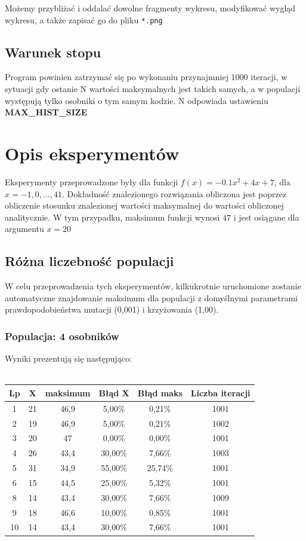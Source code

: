 \documentclass[a4paper,11pt]{article}
\begin{document}
			Możemy przybliżać i oddalać dowolne fragmenty wykresu, modyfikować wygląd wykresu, a także zapisać go do pliku \texttt{*.png}
			
		\subsection{Warunek stopu}
		Program powinien zatrzymać się po wykonaniu przynajmniej 1000 iteracji, w sytuacji gdy ostanie N wartości maksymalnych jest takich samych, a w populacji występują tylko osobniki o tym samym kodzie. N odpowiada ustawieniu \textbf{MAX\_HIST\_SIZE}
		
	\section{Opis eksperymentów}
	Eksperymenty przeprowadzone były dla funkcji $f(x) = -0.1x^2 + 4x + 7$, dla $x = -1, 0, ..., 41$. Dokładność znalezionego rozwiązania obliczona jest poprzez obliczenie stosunku znalezionej wartości maksymalnej do wartości obliczonej analitycznie. W tym przypadku, maksimum funkcji wynosi $47$ i jest osiągane dla argumentu $x = 20$
	
		\subsection{Różna liczebność populacji}
			W celu przeprowadzenia tych eksperymentów, kilkukrotnie uruchomione zostanie  automatyczne znajdowanie maksimum dla populacji z domyślnymi parametrami prawdopodobieństwa mutacji (0,001) i krzyżowania (1,00).
			\subsubsection{Populacja: 4 osobników}
				Wyniki prezentują się następująco:\\~\\
				\begin{tabular}{|c|c|c|c|c|c|}
					\hline 
					Lp & X & maksimum & Błąd X & Błąd maks & Liczba iteracji\\
					\hline
					1 & 21  & 46,9 & 5,00\%  & 0,21\% & 1001\\\hline
					2 & 19 & 46,9  & 5,00\% & 0,21\% & 1002\\\hline
					3 & 20  & 47   & 0,00\%  & 0,00\% & 1001\\\hline
					4 & 26 & 43,4  & 30,00\%  & 7,66\% & 1003\\\hline
					5 & 31 & 34,9  & 55,00\%  & 25,74\% & 1001\\\hline
					6 & 15 & 44,5  & 25,00\%  & 5,32\% & 1001\\\hline
					8 & 14 & 43,4  & 30,00\%  & 7,66\% & 1009\\\hline
					9 & 18 & 46,6  &  10,00\% & 0,85\% & 1001\\\hline
					10 & 14 & 43,4 & 30,00\% & 7,66\%& 1001\\\hline
				\end{tabular} 
\end{document}
